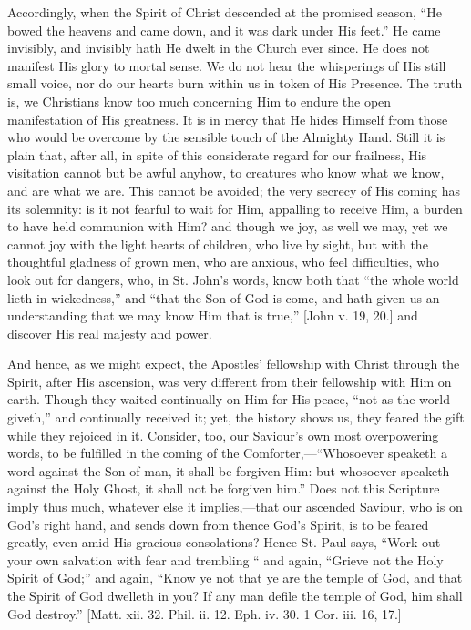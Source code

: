 Accordingly, when the Spirit of Christ descended at the promised
season, ``He bowed the heavens and came down, and it was dark
under His feet.'' He came invisibly, and invisibly hath He dwelt
in the Church ever since. He does not manifest His glory to mortal
sense. We do not hear the whisperings of His still small voice, nor do
our hearts burn within us in token of His Presence. The truth is, we
Christians know too much concerning Him to endure the open
manifestation of His greatness. It is in mercy that He hides Himself
from those who would be overcome by the sensible touch of the Almighty
Hand. Still it is plain that, after all, in spite of this considerate
regard for our frailness, His visitation cannot but be awful anyhow,
to creatures who know what we know, and are what we are. This cannot
be avoided; the very secrecy of His coming has its solemnity: is it
not fearful to wait for Him, appalling to receive Him, a burden to
have held communion with Him? and though we joy, as well we may, yet
we cannot joy with the light hearts of children, who live by sight,
but with the thoughtful gladness of grown men, who are anxious, who
feel difficulties, who look out for dangers, who, in St. John's words,
know both that ``the whole world lieth in wickedness,'' and
``that the Son of God is come, and hath given us an understanding
that we may know Him that is true,'' [John v. 19, 20.] and
discover His real majesty and power.

And hence, as we might expect, the Apostles' fellowship with Christ
through the Spirit, after His ascension, was very different from their
fellowship with Him on earth. Though they waited continually on Him
for His peace, ``not as the world giveth,'' and continually
received it; yet, the history shows us, they feared the gift while
they rejoiced in it. Consider, too, our Saviour's own most
overpowering words, to be fulfilled in the coming of the Comforter,—``Whosoever
speaketh a word against the Son of man, it shall be forgiven Him: but
whosoever speaketh against the Holy Ghost, it shall not be forgiven
him.'' Does not this Scripture imply thus much, whatever else it
implies,—that our ascended Saviour, who is on God's right hand, and
sends down from thence God's Spirit, is to be feared greatly, even
amid His gracious consolations? Hence St. Paul says, ``Work out
your own salvation with fear and trembling `` and again,
``Grieve not the Holy Spirit of God;'' and again, ``Know
ye not that ye are the temple of God, and that the Spirit of God
dwelleth in you? If any man defile the temple of God, him shall God
destroy.'' [Matt. xii. 32. Phil. ii. 12. Eph. iv. 30. 1 Cor. iii.
16, 17.]

